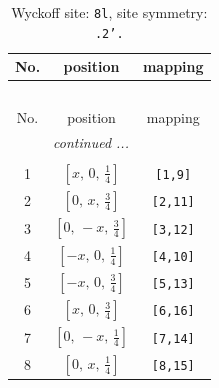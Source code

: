 \documentclass[fleqn,8pt]{jsarticle}
\begin{document}
\begin{longtable}{ccc}
\caption{Wyckoff site: {\tt 8l}, site symmetry: {\tt .2'.}}
 \\
 \hline \hline
No. & position & mapping \\ \hline \endfirsthead

\multicolumn{2}{l}{\tablename\ \thetable{}} \\
 \hline \hline
No. & position & mapping \\ \hline \endhead

 \hline \hline
\multicolumn{2}{r}{\footnotesize\it continued ...} \\ \endfoot

 \hline \hline
\multicolumn{2}{r}{} \\ \endlastfoot

1 & $\left[ x,\, 0,\, \frac{1}{4} \right]$ & {\tt [1,9]} \\ \hline
2 & $\left[ 0,\, x,\, \frac{3}{4} \right]$ & {\tt [2,11]} \\ \hline
3 & $\left[ 0,\, - x,\, \frac{3}{4} \right]$ & {\tt [3,12]} \\ \hline
4 & $\left[ - x,\, 0,\, \frac{1}{4} \right]$ & {\tt [4,10]} \\ \hline
5 & $\left[ - x,\, 0,\, \frac{3}{4} \right]$ & {\tt [5,13]} \\ \hline
6 & $\left[ x,\, 0,\, \frac{3}{4} \right]$ & {\tt [6,16]} \\ \hline
7 & $\left[ 0,\, - x,\, \frac{1}{4} \right]$ & {\tt [7,14]} \\ \hline
8 & $\left[ 0,\, x,\, \frac{1}{4} \right]$ & {\tt [8,15]} \\
\end{longtable}
\renewcommand{\arraystretch}{1.2}
\end{document}
